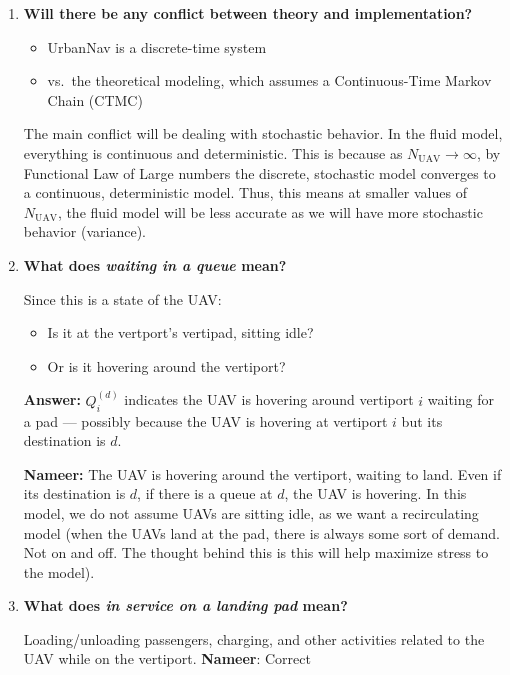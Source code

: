 \documentclass[12pt]{article}
\begin{document}
\begin{enumerate}

    \item \textbf{Will there be any conflict between theory and implementation?}
    \begin{itemize}
        \item UrbanNav is a discrete-time system
        \item vs.\ the theoretical modeling, which assumes a Continuous-Time Markov Chain (CTMC)
    \end{itemize}

    The main conflict will be dealing with stochastic behavior. In the fluid model, everything is continuous and deterministic. This is because as $ N_{\text{UAV}} \to \infty $, by Functional Law of Large numbers the discrete, stochastic model converges to a continuous, deterministic model. Thus, this means at smaller values of $N_{\text{UAV}}$, the fluid model will be less accurate as we will have more stochastic behavior (variance).

    \item \textbf{What does \emph{waiting in a queue} mean?}

    Since this is a state of the UAV:
    \begin{itemize}
        \item Is it at the vertport's vertipad, sitting idle?
        \item Or is it hovering around the vertiport?
    \end{itemize}

    \textbf{Answer:} $Q_{i}^{(d)}$ indicates the UAV is hovering around vertiport $i$ waiting for a pad --- possibly because the UAV is hovering at vertiport $i$ but its destination is $d$.

    \textbf{Nameer:} The UAV is hovering around the vertiport, waiting to land. Even if its destination is $d$, if there is a queue at $d$, the UAV is hovering. In this model, we do not assume UAVs are sitting idle, as we want a recirculating model (when the UAVs land at the pad, there is always some sort of demand. Not on and off. The thought behind this is this will help maximize stress to the model).

    \item \textbf{What does \emph{in service on a landing pad} mean?}

    Loading/unloading passengers, charging, and other activities related to the UAV while on the vertiport. \textbf{Nameer}: Correct


\end{enumerate}
\end{document}
